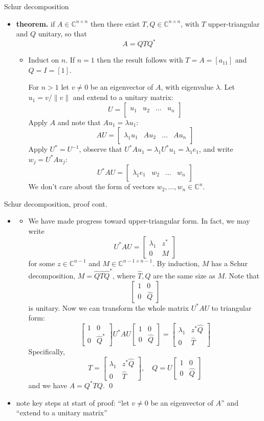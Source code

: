 \documentclass[10pt,hyperref]{beamer}
\newcommand{\CC}{\mathbb{C}}
\newcommand{\trefmatrixthree}[3]{\left[\begin{array}{c|c|c|c} & & & \\ #1 & #2 & \dots & #3 \\ & & & \end{array}\right]}
\newcommand{\blocktwo}[4]{\left[\begin{array}{c|c} #1 & #2 \\ \hline #3 & #4 \end{array}\right]}
\newcommand{\bqed}{{\color{blue}\qed}}
\begin{document}
\begin{frame}{Schur decomposition}

\begin{itemize}
\item \textbf{theorem.} if $A\in \CC^{n\times n}$ then there exist $T,Q\in \CC^{n\times n}$, with $T$ upper-triangular and $Q$ unitary, so that
    $$A = Q T Q^*$$

\vspace{-2mm}
    \begin{itemize}
    \footnotesize
    \item[\emph{proof.}] Induct on $n$.  If $n=1$ then the result follows with $T=A=[a_{11}]$ and $Q=I=[1]$.

\quad For $n>1$ let $v\ne 0$ be an eigenvector of $A$, with eigenvalue $\lambda$. Let $u_1=v/\|v\|$ and extend to a unitary matrix:
    $$U = \trefmatrixthree{u_1}{u_2}{u_n}$$
Apply $A$ and note that $Au_1=\lambda u_1$:
    $$AU = \trefmatrixthree{\lambda_1 u_1}{A u_2}{A u_n}$$
Apply $U^*=U^{-1}$, observe that $U^*Au_1 = \lambda_1 U^* u_1 = \lambda_1 e_1$, and write $w_j=U^*Au_j$:
    $$U^*AU = \trefmatrixthree{\lambda_1 e_1}{w_2}{w_n}$$
We don't care about the form of vectors $w_2,\dots,w_n \in \CC^n$.
    \end{itemize}
\normalsize
\end{itemize}
\end{frame}


\begin{frame}{Schur decomposition, proof cont.}

\begin{itemize}
\item[]
    \begin{itemize}
    \footnotesize
    \item[] \quad We have made progress toward upper-triangular form.  In fact, we may write
    $$U^*AU = \blocktwo{\lambda_1}{z^*}{0}{M}$$
for some $z\in \CC^{n-1}$ and $M\in \CC^{n-1 \times n-1}$.  By induction, $M$ has a Schur decomposition, $M=\hat Q \hat T \hat Q^*$, where $\hat T,\hat Q$ are the same size as $M$.  Note that
    $$\blocktwo{1}{0}{0}{\hat Q}$$
is unitary.  Now we can transform the whole matrix $U^*AU$ to triangular form:
    $$\blocktwo{1}{0}{0}{\hat Q^*} U^*AU \blocktwo{1}{0}{0}{\hat Q} = \blocktwo{\lambda_1}{z^*\hat Q}{0}{\hat T}$$
Specifically,
    $$T = \blocktwo{\lambda_1}{z^*\hat Q}{0}{\hat T}, \quad Q = U \blocktwo{1}{0}{0}{\hat Q}$$
and we have $A=Q^*T Q$. \bqed
    \end{itemize}
\normalsize

\bigskip
\item note key steps at start of proof: ``let $v\ne 0$ be an eigenvector of $A$'' and ``extend to a unitary matrix''
\end{itemize}
\end{frame}
\end{document}
